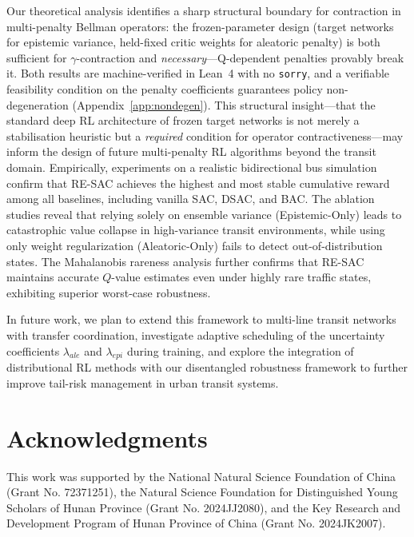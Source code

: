 \documentclass[10pt]{article}
\begin{document}
Our theoretical analysis identifies a sharp structural boundary for contraction in multi-penalty Bellman operators: the frozen-parameter design (target networks for epistemic variance, held-fixed critic weights for aleatoric penalty) is both sufficient for $\gamma$-contraction and \emph{necessary}---Q-dependent penalties provably break it.  Both results are machine-verified in Lean~4 with no \texttt{sorry}, and a verifiable feasibility condition on the penalty coefficients guarantees policy non-degeneration (Appendix~\ref{app:nondegen}).  This structural insight---that the standard deep RL architecture of frozen target networks is not merely a stabilisation heuristic but a \emph{required} condition for operator contractiveness---may inform the design of future multi-penalty RL algorithms beyond the transit domain. Empirically, experiments on a realistic bidirectional bus simulation confirm that RE-SAC achieves the highest and most stable cumulative reward among all baselines, including vanilla SAC, DSAC, and BAC. The ablation studies reveal that relying solely on ensemble variance (Epistemic-Only) leads to catastrophic value collapse in high-variance transit environments, while using only weight regularization (Aleatoric-Only) fails to detect out-of-distribution states. The Mahalanobis rareness analysis further confirms that RE-SAC maintains accurate $Q$-value estimates even under highly rare traffic states, exhibiting superior worst-case robustness.

In future work, we plan to extend this framework to multi-line transit networks with transfer coordination, investigate adaptive scheduling of the uncertainty coefficients $\lambda_{ale}$ and $\lambda_{epi}$ during training, and explore the integration of distributional RL methods with our disentangled robustness framework to further improve tail-risk management in urban transit systems.

\section*{Acknowledgments}
This work was supported by the National Natural Science Foundation of China (Grant No. 72371251), the Natural Science Foundation for Distinguished Young Scholars of Hunan Province (Grant No. 2024JJ2080), and the Key Research and Development Program of Hunan Province of China (Grant No. 2024JK2007).




\end{document}

